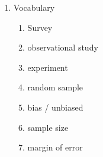 \documentclass[12pt, twoside]{article}
\begin{document}
\begin{enumerate}
\item Vocabulary \\ 
\begin{enumerate}
        \item Survey
        \item observational study
        \item experiment
        \item random sample
        \item bias / unbiased
        \item sample size
        \item margin of error
    \end{enumerate}


\end{enumerate}
\end{document}
